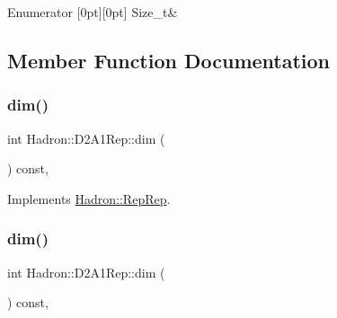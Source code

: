 \begin{DoxyEnumFields}{Enumerator}
[0pt][0pt]{}\mbox{\label{structHadron_1_1D2A1Rep_abfb13b304e55a35a241fa90755632303ae2b29155c82be78577eed84b15b0b5b6}} 
Size\+\_\+t&\\
\hline

\end{DoxyEnumFields}


\subsection{Member Function Documentation}
\mbox{\label{structHadron_1_1D2A1Rep_aba72a454b36e387861f8984650234865}} 
\subsubsection{\texorpdfstring{dim()}{dim()}\hspace{0.1cm}{\footnotesize\ttfamily [1/3]}}
{\footnotesize\ttfamily int Hadron\+::\+D2\+A1\+Rep\+::dim (\begin{DoxyParamCaption}{ }\end{DoxyParamCaption}) const\hspace{0.3cm}{\ttfamily [inline]}, {\ttfamily [virtual]}}



Implements \mbox{\hyperlink{structHadron_1_1RepRep_a92c8802e5ed7afd7da43ccfd5b7cd92b}{Hadron\+::\+Rep\+Rep}}.

\mbox{\label{structHadron_1_1D2A1Rep_aba72a454b36e387861f8984650234865}} 
\subsubsection{\texorpdfstring{dim()}{dim()}\hspace{0.1cm}{\footnotesize\ttfamily [2/3]}}
{\footnotesize\ttfamily int Hadron\+::\+D2\+A1\+Rep\+::dim (\begin{DoxyParamCaption}{ }\end{DoxyParamCaption}) const\hspace{0.3cm}{\ttfamily [inline]}, {\ttfamily [virtual]}}



